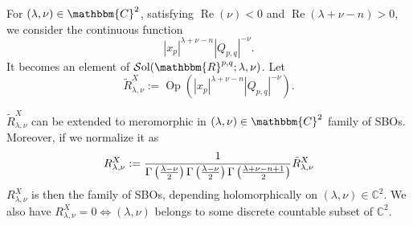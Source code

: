 \documentclass[pdf]{beamer}
\newcommand{\tmop}[1]{\ensuremath{\operatorname{#1}}}
\newcommand{\assign}{:=}
\theoremstyle{mystyle}
\theoremstyle{remark}
\begin{document}
\begin{frame}
	\begin{theorem}
For
$(\lambda, \nu) \in \mathbbm{C}^2$, satisfying
$\tmop{Re} (\nu) < 0$ and $\tmop{Re}
(\lambda + \nu - n) > 0$, we consider the continuous function
\vspace{-0.6em}
\begin{equation*}
	| x_p |^{\lambda + \nu - n} | Q_{p, q} |^{- \nu}.
\end{equation*}
It becomes an element of $\mathcal{S} \mbox{ol} (\mathbbm{R}^{p, q} ; \lambda, \nu)$.
\vspace{-0.5em}
Let
\begin{equation*}
	\tilde{R}_{\lambda, \nu}^X \assign \tmop{Op} (| x_p
	|^{\lambda + \nu - n} | Q_{p, q} |^{- \nu}).
\end{equation*}
	\end{theorem}
\vspace{-0.4em}
\begin{theorem}
		$\tilde{R}_{\lambda, \nu}^X$ can be extended to meromorphic in $(\lambda, \nu) \in
\mathbbm{C}^2$ family of SBOs. Moreover, if we normalize it as
\vspace{-1.1em}
\begin{equation*}
	{R}_{\lambda, \nu}^X \assign \frac{1}{\Gamma
\left( \frac{\lambda - \nu}{2} \right) \Gamma \left( \frac{\lambda - \nu}{2}
\right) \Gamma \left( \frac{\lambda + \nu - n + 1}{2} \right)} \tilde{R}_{\lambda,
\nu}^X
\vspace{-0.6em}
\end{equation*}
$R_{\lambda,\nu}^X$ is then the family of SBOs, depending holomorphically on $(\lambda,\nu)\in\mathbb{C}^2$.
We also have $R^X_{\lambda,\nu}=0\iff(\lambda,\nu)$ belongs to some discrete countable subset of $\mathbb{C}^2$.
	\end{theorem}
\end{frame}
\end{document}
